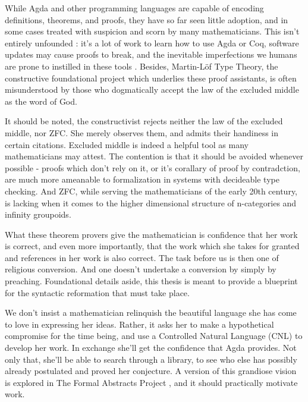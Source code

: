While Agda and other programming languages are capable of encoding definitions,
theorems, and proofs, they have so far seen little adoption, and in some cases
treated with suspicion and scorn by many mathematicians.  This isn't entirely
unfounded : it's a lot of work to learn how to use Agda or Coq, software
updates may cause proofs to break, and the inevitable imperfections we humans
are prone to 
instilled in these tools . Besides, Martin-Löf
Type Theory, the constructive foundational project which underlies these proof
assistants, is often misunderstood by those who dogmatically accept the law of the
excluded middle as the word of God.

It should be noted, the constructivist rejects neither the law of the excluded
middle, nor ZFC. She merely observes them, and admits their handiness in certain
citations. Excluded middle is indeed a helpful tool as many mathematicians
may attest. The contention is that it should be avoided whenever possible -
proofs which don't rely on it, or it's corallary of proof by contradction, are
much more ameanable to formalization in systems with decideable type checking.
And ZFC, while serving the mathematicians of the early 20th century, is 
lacking when it comes to the higher dimensional structure of n-categories and
infinity groupoids.

What these theorem provers give the mathematician is confidence that her work
is correct, and even more importantly, that the work which she takes for
granted and references in her work is also correct. The task before us is then
one of religious conversion. And one doesn't undertake a conversion by simply
by preaching. Foundational details aside, this thesis is meant to provide a
blueprint for the syntactic reformation that must take place.  

We don't insist a mathematician relinquish the beautiful language she has
come to love in expressing her ideas.  Rather, it asks her to make a
hypothetical compromise
for the time being, and use a Controlled Natural Language (CNL) to develop her
work. In exchange she'll get the confidence that Agda provides. Not only that,
she'll be able to search through a library, to see who else has possibly
already postulated and proved her conjecture. A version of this grandiose vision is 
explored in The Formal Abstracts Project \cite{halesCNL}, and it should
practically motivate work.  

